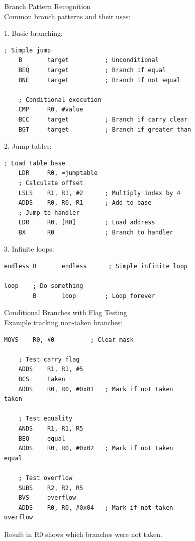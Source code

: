 \begin{KR}{Branch Pattern Recognition}\\
Common branch patterns and their uses:

1. Basic branching:
\begin{lstlisting}[language=armasm, style=basesmol]
    ; Simple jump
    B       target          ; Unconditional
    BEQ     target          ; Branch if equal
    BNE     target          ; Branch if not equal
    
    ; Conditional execution
    CMP     R0, #value
    BCC     target          ; Branch if carry clear
    BGT     target          ; Branch if greater than
\end{lstlisting}

2. Jump tables:
\begin{lstlisting}[language=armasm, style=basesmol]
    ; Load table base
    LDR     R0, =jumptable
    ; Calculate offset
    LSLS    R1, R1, #2      ; Multiply index by 4
    ADDS    R0, R0, R1      ; Add to base
    ; Jump to handler
    LDR     R0, [R0]        ; Load address
    BX      R0              ; Branch to handler
\end{lstlisting}

3. Infinite loops:
\begin{lstlisting}[language=armasm, style=basesmol]
endless B       endless      ; Simple infinite loop

loop    ; Do something
        B       loop        ; Loop forever
\end{lstlisting}
\end{KR}

\begin{example2}{Conditional Branches with Flag Testing}\\
Example tracking non-taken branches:
\begin{lstlisting}[language=armasm, style=basesmol]
    MOVS    R0, #0          ; Clear mask
    
    ; Test carry flag
    ADDS    R1, R1, #5
    BCS     taken
    ADDS    R0, R0, #0x01   ; Mark if not taken
taken

    ; Test equality
    ANDS    R1, R1, R5
    BEQ     equal
    ADDS    R0, R0, #0x02   ; Mark if not taken
equal

    ; Test overflow
    SUBS    R2, R2, R5
    BVS     overflow
    ADDS    R0, R0, #0x04   ; Mark if not taken
overflow
\end{lstlisting}

Result in R0 shows which branches were not taken.
\end{example2}







